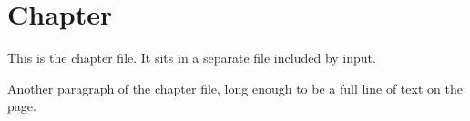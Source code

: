 \section{Chapter}
This is the chapter file. It sits in a separate file included by input.

Another paragraph of the chapter file, long enough to be a full line of text on the page.
